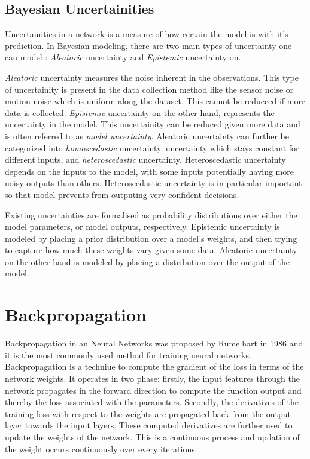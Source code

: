 \subsection{Bayesian Uncertainities}

Uncertainities in a network is a measure of how certain the model is with it's prediction. In Bayesian modeling, there are two main types of uncertainty one can model \citep{der2009aleatory}: \textit{Aleatoric} uncertainty and \textit{Epistemic} uncertainty on. 

\textit{Aleatoric} uncertainty measures the noise inherent in the observations. This type of uncertainity is present in the data collection method like the sensor noise or motion noise which is uniform along the dataset. This cannot be reducced if more data is collected. \textit{Epistemic} uncertainty on the other hand, represents the uncertainty in the model. This uncertainity can be reduced given more data and is often referred to as \textit{model uncertainty}.  Aleatoric uncertainty can further be categorized into \textit{homoscedastic} uncertainty, uncertainty which stays constant for different inputs, and \textit{heteroscedastic} uncertainty. Heteroscedastic uncertainty depends on the inputs to the model, with some inputs potentially having more noisy outputs than others. Heteroscedastic uncertainty is in particular important so that model prevents from outputing very confident decisions.

Existing uncertainties are formalised as probability distributions over either the model parameters, or model outputs, respectively. Epistemic uncertainty is modeled by placing a prior distribution over a model's weights, and then trying to capture how much these weights vary given some data. Aleatoric uncertainty on the other hand is modeled by placing a distribution over the output of the model.

\section{Backpropagation}

Backpropagation in an Neural Networks was proposed by Rumelhart \cite{Rumelhart} in 1986 and it is the most commonly used method for training neural networks. Backpropagation is a techniue to compute the gradient of the loss in terms of the network weights. It operates in two phase: firstly, the input features through the network propagates in the forward direction to compute the function output and thereby the loss associated with the parameters. Secondly, the derivatives of the training loss with respect to the weights
are propagated back from the output layer towards the input layers.
These computed derivatives are further used to update the weights of the network. This is a continuous process and updation of the weight occurs continuously over every iterations. 

